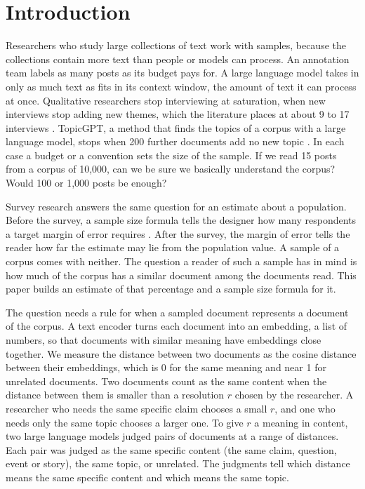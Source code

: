 \section{Introduction}

Researchers who study large collections of text work with samples, because the collections contain more text than people or models can process. An annotation team labels as many posts as its budget pays for. A large language model takes in only as much text as fits in its context window, the amount of text it can process at once. Qualitative researchers stop interviewing at saturation, when new interviews stop adding new themes, which the literature places at about 9 to 17 interviews \citep{guest2006,hennink2022}. TopicGPT, a method that finds the topics of a corpus with a large language model, stops when 200 further documents add no new topic \citep{pham2024topicgpt}. In each case a budget or a convention sets the size of the sample. If we read 15 posts from a corpus of 10{,}000, can we be sure we basically understand the corpus? Would 100 or 1{,}000 posts be enough?

Survey research answers the same question for an estimate about a population. Before the survey, a sample size formula tells the designer how many respondents a target margin of error requires \citep{cochran1977,kish1965}. After the survey, the margin of error tells the reader how far the estimate may lie from the population value. A sample of a corpus comes with neither. The question a reader of such a sample has in mind is how much of the corpus has a similar document among the documents read. This paper builds an estimate of that percentage and a sample size formula for it.

The question needs a rule for when a sampled document represents a document of the corpus. A text encoder turns each document into an embedding, a list of numbers, so that documents with similar meaning have embeddings close together. We measure the distance between two documents as the cosine distance between their embeddings, which is 0 for the same meaning and near 1 for unrelated documents. Two documents count as the same content when the distance between them is smaller than a resolution $r$ chosen by the researcher. A researcher who needs the same specific claim chooses a small $r$, and one who needs only the same topic chooses a larger one. To give $r$ a meaning in content, two large language models judged pairs of documents at a range of distances. Each pair was judged as the same specific content (the same claim, question, event or story), the same topic, or unrelated. The judgments tell which distance means the same specific content and which means the same topic.

